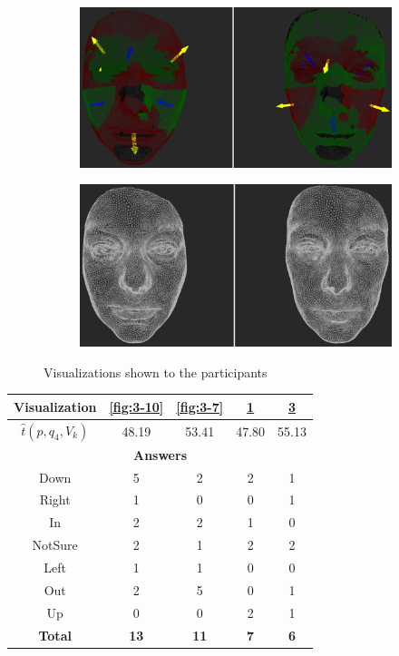 \begin{figure}[h]
\begin{subfigure}{0.4\textwidth}
\includegraphics[width=\textwidth]{./screenshots/pair9.PNG}
\caption{}
\label{fig:3-9}
\end{subfigure}
\quad
\begin{subfigure}{0.4\textwidth}
\includegraphics[width=\textwidth]{./screenshots/pair6.PNG}
\caption{}
\label{fig:3-6}
\end{subfigure}
\caption{Visualizations shown to the participants}
\end{figure}
\medskip

\begin{center}
\begin{tabular}{| c | c | c | c | c |}
	\hline
	Visualization & \ref{fig:3-10} & \ref{fig:3-7} & \ref{fig:3-9} & \ref{fig:3-6}\\ \hline
	\(\widehat{t}(p, q_4, V_k)\) & 48.19 & 53.41 & 47.80 & 55.13\\ \hline
	\multicolumn{5}{|c|}{\bf Answers} \\ \hline
	Down & 5 & 2 & 2 & 1\\ \hline
	Right & 1 & 0 & 0 & 1\\ \hline
	In & 2 & 2 & 1 & 0\\ \hline
	NotSure & 2 & 1 & 2 & 2\\ \hline
	Left & 1 & 1 & 0 & 0\\ \hline
	Out & 2 & 5 & 0 & 1\\ \hline
	Up & 0 & 0 & 2 & 1\\ \hline
	{\bf Total} & {\bf 13} & {\bf 11} & {\bf 7} & {\bf 6}\\ \hline
\end{tabular}
\end{center}
\clearpage


